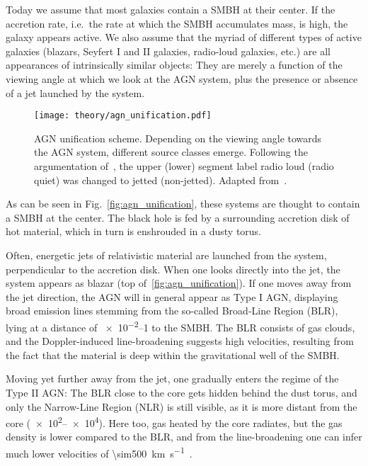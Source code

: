 Today we assume that most galaxies contain a SMBH at their center. If the accretion rate, i.e.\ the rate at which the SMBH accumulates mass, is high, the galaxy appears active. We also assume that the myriad of different types of active galaxies (blazars, Seyfert I and II galaxies, radio-loud galaxies, etc.) are all appearances of intrinsically similar objects: They are merely a function of the viewing angle at which we look at the AGN system, plus the presence or absence of a jet launched by the system.

\begin{figure}[htb]
  \texttt{[image: theory/agn\_unification.pdf]}
  \caption[AGN unification scheme]{AGN unification scheme. Depending on the viewing angle towards the AGN system, different source classes emerge. Following the argumentation of~\cite{Padovani2017}, the upper (lower) segment label radio loud (radio quiet) was changed to jetted (non-jetted). Adapted from~\cite{Thorne2022}.}
\end{figure}

As can be seen in Fig.~\ref{fig:agn_unification}, these systems are thought to contain a SMBH at the center. The black hole is fed by a surrounding accretion disk of hot material, which in turn is enshrouded in a dusty torus.

Often, energetic jets of relativistic material are launched from the system, perpendicular to the accretion disk. When one looks directly into the jet, the system appears as blazar (top of~\ref{fig:agn_unification}). If one moves away from the jet direction, the AGN will in general appear as Type I AGN, displaying broad emission lines stemming from the so-called Broad-Line Region (BLR), lying at a distance of \SIrange{e-2}{1}{\parsec} to the SMBH. The BLR consists of gas clouds, and the Doppler-induced line-broadening suggests high velocities, resulting from the fact that the material is deep within the gravitational well of the SMBH.

Moving yet further away from the jet, one gradually enters the regime of the Type II AGN: The BLR close to the core gets hidden behind the dust torus, and only the  Narrow-Line Region (NLR) is still visible, as it is more distant from the core (\SIrange{e2}{e4}{\parsec}). Here too, gas heated by the core radiates, but the gas density is lower compared to the BLR, and from the line-broadening one can infer much lower velocities of \SI{\sim500}{\kilo\m\per\s}~.

